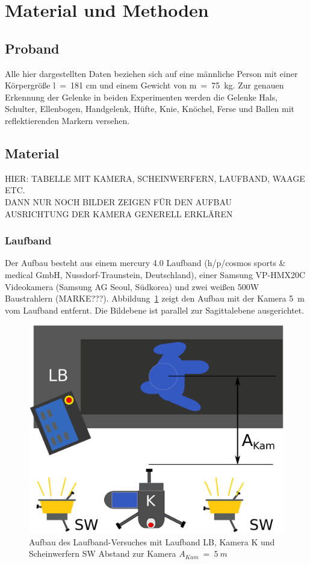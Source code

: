 \section{Material und Methoden}

\subsection{Proband}
Alle hier dargestellten Daten beziehen sich auf eine männliche Person mit einer Körpergröße l~=~181 cm und einem Gewicht von m~=~75~kg. Zur genauen Erkennung der Gelenke in beiden Experimenten werden die Gelenke Hals, Schulter, Ellenbogen, Handgelenk, Hüfte, Knie, Knöchel, Ferse und Ballen mit reflektierenden Markern versehen.

\subsection{Material}
HIER: TABELLE MIT KAMERA, SCHEINWERFERN, LAUFBAND, WAAGE ETC.\\
DANN NUR NOCH BILDER ZEIGEN FÜR DEN AUFBAU\\
AUSRICHTUNG DER KAMERA GENERELL ERKLÄREN
\subsubsection{Laufband}
Der Aufbau besteht aus einem mercury 4.0 Laufband (h/p/cosmos sports \& medical GmbH, Nussdorf-Traunstein, Deutschland), einer Samsung VP-HMX20C Videokamera (Samsung AG Seoul, Südkorea) und zwei weißen 500W Baustrahlern (MARKE???). Abbildung~\ref{fig:laufbnd_stp} zeigt den Aufbau mit der Kamera 5~m vom Laufband entfernt. Die Bildebene ist parallel zur Sagittalebene ausgerichtet.

\begin{figure}[h!]
	\centering
	\includegraphics[width=0.5\linewidth]{bilder/mat_met/Laufband_setup}
	\caption[Aufbau Laufband Versuch]{Aufbau des Laufband-Versuches mit Laufband LB, Kamera K und Scheinwerfern SW Abstand zur Kamera $A_{Kam}~=~5~m$ }
	\label{fig:laufbnd_stp}
\end{figure}

